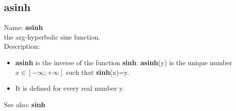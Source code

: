 \subsection{ asinh }
\noindent Name: \textbf{asinh}\\
the arg-hyperbolic sine function.\\

\noindent Description: \begin{itemize}

\item \textbf{asinh} is the inverse of the function \textbf{sinh}: \textbf{asinh}(y) is the unique number 
   $x \in [-\infty; +\infty]$ such that \textbf{sinh}(x)=y.

\item It is defined for every real number y.
\end{itemize}
See also: \textbf{sinh}

